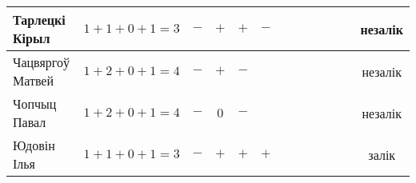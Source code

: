 \documentclass[12pt, a4paper]{extarticle}
\begin{document}
\begin{table}[H]
\begin{minipage}{\textwidth}
\begin{tabular}{|l|c|c|c|c|c|c|c|c|c|c|c|c|}
                Тарлецкі Кірыл      &   $1+1+0+1=3$   & $-$ & $+$ & $+$ & $-$ &   &  &  &  &  &  &  незалік \\ \hline
                Чацвяргоў Матвей    &   $1+2+0+1=4$   & $-$ & $+$ & $-$ &   &  &  &  &  &  &  &  незалік \\ \hline
                Чопчыц Павал        &   $1+2+0+1=4$   & $-$ & $0$  & $-$ &   & &  &  &  &  &  &  незалік \\ \hline
                Юдовін Ілья         &   $1+1+0+1=3$   & $-$ & $+$ & $+$ & $+$ &  &  &  &  &  &  &  залік \\ \hline
            \end{tabular}
        \end{minipage}
    \end{table}
\end{document}
